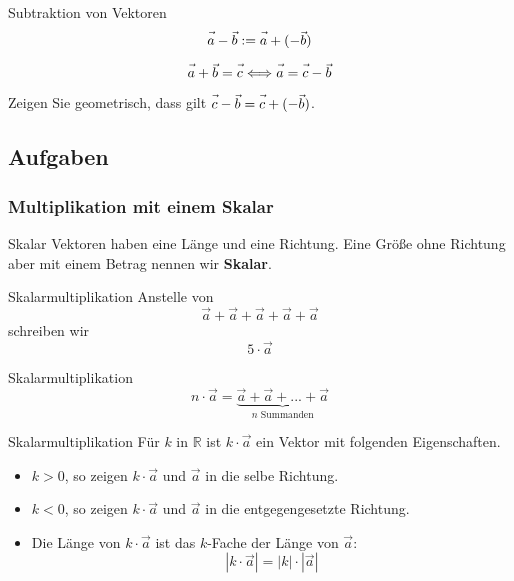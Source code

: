 \begin{definition}{Subtraktion von Vektoren}{}
  $$\vec{a\vphantom{b}} - \vec{b} := \vec{a\vphantom{b}} + (-\vec{b})$$
\end{definition}

\begin{bemerkung}{}{}
  $$\vec{a\vphantom{b}} + \vec{b} = \vec{c\vphantom{b}} \Longleftrightarrow \vec{a\vphantom{b}} = \vec{c\vphantom{b}} - \vec{b}$$
\end{bemerkung}

Zeigen Sie geometrisch, dass gilt $\vec{c\vphantom{b}} - \vec{b} = \vec{c\vphantom{b}} +
(-\vec{b})$.


\subsection*{Aufgaben}
\newpage


\subsubsection{Multiplikation mit einem Skalar}
\begin{definition}{Skalar}{}
  Vektoren haben eine Länge und eine Richtung. Eine Größe ohne
  Richtung aber mit einem Betrag nennen wir \textbf{Skalar}. 
\end{definition}

\begin{beispiel}{Skalarmultiplikation}{}
  Anstelle von
  $$\vec{a}+\vec{a}+\vec{a}+\vec{a}+\vec{a}$$
  schreiben wir
  $$5\cdot{}\vec{a}$$
\end{beispiel}

\begin{definition}{Skalarmultiplikation}{}
  $$n\cdot{}\vec{a} = \underbrace{\vec{a} + \vec{a} + ... + \vec{a}}_{n \textrm{ Summanden}}$$
\end{definition}

\begin{definition}{Skalarmultiplikation}{}
  Für $k$ in $\mathbb{R}$ ist $k\cdot{}\vec{a}$ ein Vektor mit
  folgenden Eigenschaften.

  \begin{itemize}
  \item $k>0$, so zeigen $k\cdot{}\vec{a}$ und $\vec{a}$ in die selbe Richtung.
  \item $k<0$, so zeigen $k\cdot{}\vec{a}$ und $\vec{a}$ in die entgegengesetzte Richtung.
  \item Die Länge von $k\cdot{}\vec{a}$ ist das $k$-Fache der Länge
    von $\vec{a}$: $$|k\cdot{}\vec{a}| = |k|\cdot{}|\vec{a}|$$
   \end{itemize}
\end{definition}

